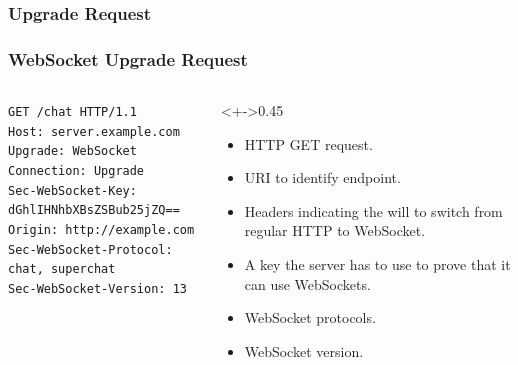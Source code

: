 \documentclass{beamer}
\begin{document}
\subsubsection{Upgrade Request}
\begin{frame}
    \frametitle{WebSocket Upgrade Request}
    \begin{columns}
        \begin{column}{0.6\textwidth}
            \texttt{\alert<2>{GET} \alert<3>{/chat} \alert<2>{HTTP/1.1}\\
                Host: server.example.com\\
                \alert<4>{Upgrade: WebSocket}\\
                \alert<4>{Connection: Upgrade}\\
                \alert<5>{Sec-WebSocket-Key: dGhlIHNhbXBsZSBub25jZQ==}\\
                Origin: http://example.com\\
                \alert<6>{Sec-WebSocket-Protocol: chat, superchat}\\
                \alert<7>{Sec-WebSocket-Version: 13}
            }
        \end{column}
        \begin{column}<+->{0.45\textwidth}
            \begin{itemize}
                \item<2-| alert@2> HTTP GET request.
                \item<3-| alert@3> URI to identify endpoint.
                \item<4-| alert@4> Headers indicating the will to switch from regular HTTP to WebSocket.
                \item<5-| alert@5> A key the server has to use to prove that it can use WebSockets.
                \item<6-| alert@6> WebSocket protocols.
                \item<7-| alert@7> WebSocket version.
            \end{itemize}
        \end{column}
    \end{columns}
\end{frame}
\end{document}
